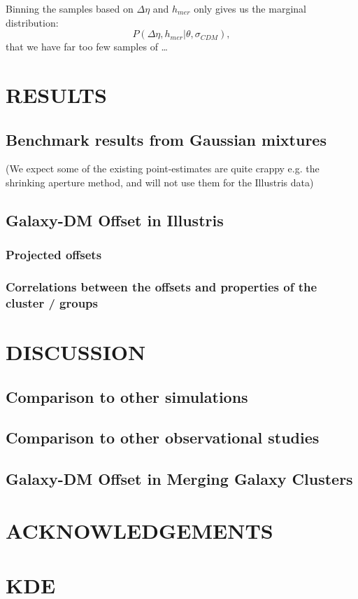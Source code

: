 \documentclass[letterpaper,useAMS,usenatbib]{mn2e}
\begin{document}
Binning the samples based on $\Delta \eta$ and $h_{mer}$ only gives us the
marginal distribution:
\begin{equation}
	P(\Delta \eta, h_{mer} | \theta, \sigma_{CDM}),
\end{equation}
that we have far too few samples of \dots


\section{RESULTS} 
\subsection{Benchmark results from Gaussian mixtures} 
(We expect some of the existing point-estimates are quite crappy e.g. the
shrinking aperture method, and will not
use them for the Illustris data) 

\subsection{Galaxy-DM Offset in Illustris}
\subsubsection{Projected offsets}
\subsubsection{Correlations between the offsets and properties of the cluster / groups}
\section{DISCUSSION}
\subsection{Comparison to other simulations}
\subsection{Comparison to other observational studies}
\subsection{Galaxy-DM Offset in Merging Galaxy Clusters}
\section{ACKNOWLEDGEMENTS}




\appendix
\section{KDE}
\clearpage\bsp\label{lastpage} 
\end{document}
